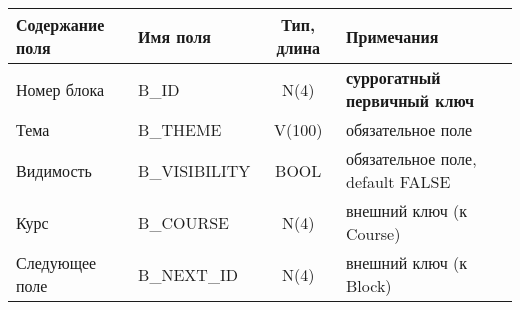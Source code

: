 \documentclass[a4paper,14pt]{article}
\begin{document}
\begin{table}[H]
	\begin{flushleft} 
	\end{flushleft}
	\begin{adjustbox}{width=\linewidth}
		\begin{tabular}{|l|l|c|l|}
			\hline
			Содержание поля & Имя поля      & Тип, длина & Примечания                          \\ \hline
			Номер блока     & B\_ID         &    N(4)    & \textbf{суррогатный первичный ключ} \\ \hline
			Тема            & B\_THEME      &   V(100)   & обязательное поле                   \\ \hline
			Видимость       & B\_VISIBILITY &    BOOL    & обязательное поле, default FALSE    \\ \hline
			Курс            & B\_COURSE     &    N(4)    & внешний ключ (к Course)             \\ \hline
			Следующее поле  & B\_NEXT\_ID   &    N(4)    & внешний ключ (к Block)              \\ \hline
		\end{tabular}
	\end{adjustbox}
\end{table}

\end{document}
